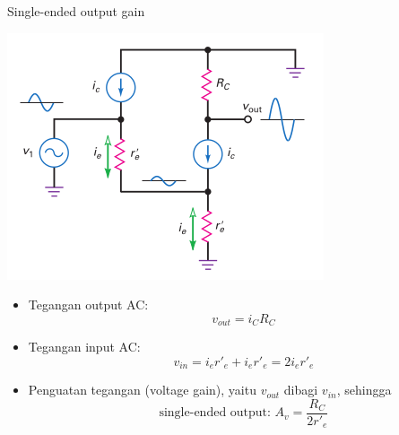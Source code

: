 \documentclass[aspectratio=169]{beamer}
\begin{document}
\begin{frame}{Single-ended output gain}
	\begin{multicols}{2}
		\begin{center}
			\includegraphics[height=0.7\textheight]{gambar/01.diff-amp/01.simplified_ac-equivalent_circuit}
		\end{center}
		\columnbreak
		\begin{itemize}
			\item Tegangan output AC: $$ v_{out} = i_C R_C $$
			\item Tegangan input AC: $$ v_{in} = i_e r'_e + i_e r'_e = 2i_er'_e $$
			\item Penguatan tegangan (voltage gain), yaitu $ v_{out} $ dibagi $ v_{in} $, sehingga
			\begin{equation}
				\text{single-ended output: } A_v = \frac{R_C}{2r'_e}
			\end{equation}
		\end{itemize}
	\end{multicols}
\end{frame}
\end{document}
